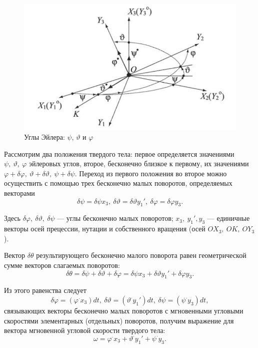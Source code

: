\documentclass[14pt]{extreport}
\renewcommand{\phi}{\varphi} %
\begin{document}
\begin{figure}[H]
\center\includegraphics[scale=0.5]{fig/img12.png}
\caption{Углы Эйлера: $\psi$, $\vartheta$ и $\phi$}
\end{figure}

Рассмотрим два положения твердого тела: первое определяется значениями $\psi,\ \vartheta,\ \phi$ эйлеровых углов, второе, бесконечно близкое к первому, их значениями $\phi+\delta\phi,\ \vartheta+\delta\vartheta,\ \psi+\delta\psi$. Переход из первого положения во второе можно осуществить с помощью трех бесконечно малых поворотов, определяемых векторами
\begin{equation}
\delta\psi=\delta\psi x_{3},\ \delta\vartheta=\delta\vartheta y_{1}',\ \delta\phi=\delta\phi y_{3}.
\end{equation}

Здесь $\delta\phi,\ \delta\vartheta,\ \delta\psi$ — углы бесконечно малых поворотов; $x_{3},\ y_{1}', y_{3}$ — единичные векторы осей прецессии, нутации и собственного вращения (осей $OX_{3},\ OK,\ OY_{3}$).

Вектор $\delta\theta$ результирующего бесконечно малого поворота равен гео­метрической сумме векторов слагаемых поворотов:
\begin{equation}
\delta\theta=\delta\psi+\delta\vartheta+\delta\phi=\delta\psi x_{3}+\delta\vartheta y_{1}'+\delta\phi y_{3}.
\end{equation}

Из этого равенства следует
\begin{equation}
\delta\phi=(\phi^{\cdot} x_{3})dt,\ \delta\vartheta=(\vartheta^{\cdot} y_{1}')dt,\ \delta\psi=(\psi^{\cdot} y_{3})dt,
\end{equation}
связывающих векторы бесконечно малых поворотов с мгновенными угловыми скоростями элементарных (отдельных) поворотов, получим выражение для вектора мгновенной угловой скорости твердого тела:
\begin{equation}
\label{res-omega}
\omega=\phi^{\cdot} x_{3}+\vartheta^{\cdot} y_{1}'+\psi^{\cdot} y_{3}.
\end{equation}
\end{document}

